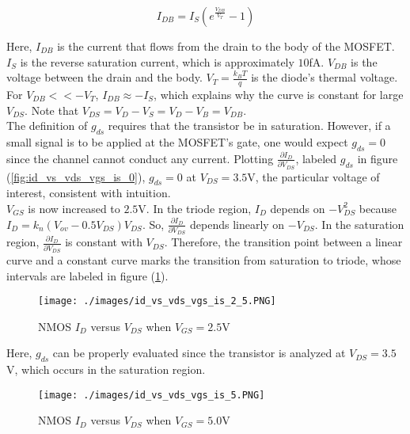 \begin{equation}
	\label{eq:shockley_diode}
	I_{DB} = I_{S} ( e^{ \frac{ V_{DB} }{ V_{T} } } - 1 )
\end{equation}

Here, $I_{DB}$ is the current that flows from the drain to the body of the MOSFET.
$I_{S}$ is the reverse saturation current, which is approximately $10$\si{\femto\ampere}.
$V_{DB}$ is the voltage between the drain and the body.
$V_{T} = \frac{ k_{B} T }{ q }$ is the diode's thermal voltage.
For $V_{DB} << -V_{T}$, $I_{DB} \approx -I_{S}$, which explains why the curve is constant for large $V_{DS}$.
Note that $V_{DS} = V_{D} - V_{S} = V_{D} - V_{B} = V_{DB}$. \\

The definition of $g_{ds}$ requires that the transistor be in saturation.
However, if a small signal is to be applied at the MOSFET's gate, one would expect $g_{ds} = 0$ since the channel cannot conduct any current.
Plotting $\frac{ \partial I_{D} }{ \partial V_{DS} }$, labeled $g_{ds}$ in figure (\ref{fig:id_vs_vds_vgs_is_0}), $g_{ds} = 0$ at $V_{DS} = 3.5$\si{\volt}, the particular voltage of interest, consistent with intuition. \\

$V_{GS}$ is now increased to $2.5\si{\volt}$.
In the triode region, $I_{D}$ depends on $-V_{DS}^{2}$ because $I_{D} = k_{n} ( V_{ov} - 0.5 V_{DS} ) V_{DS}$.
So, $\frac{ \partial I_{D} }{ \partial V_{DS} }$ depends linearly on $-V_{DS}$.
In the saturation region, $\frac{ \partial I_{D} }{ \partial V_{DS} }$ is constant with $V_{DS}$.
Therefore, the transition point between a linear curve and a constant curve marks the transition from saturation to triode, whose intervals are labeled in figure (\ref{fig:id_vs_vds_vgs_is_2_5}).

\FloatBarrier

\begin{figure}[h!]
	\centering
	\texttt{[image: ./images/id\_vs\_vds\_vgs\_is\_2\_5.PNG]}
	\caption{NMOS $I_{D}$ versus $V_{DS}$ when $V_{GS} = 2.5$\si{\volt}}
	\label{fig:id_vs_vds_vgs_is_2_5}
\end{figure}

\FloatBarrier

Here, $g_{ds}$ can be properly evaluated since the transistor is analyzed at $V_{DS} = 3.5$\si{\volt}, which occurs in the saturation region.

\FloatBarrier

\begin{figure}[h!]
	\centering
	\texttt{[image: ./images/id\_vs\_vds\_vgs\_is\_5.PNG]}
	\caption{NMOS $I_{D}$ versus $V_{DS}$ when $V_{GS} = 5.0$\si{\volt}}
	\label{fig:id_vs_vds_vgs_is_5}
\end{figure}

